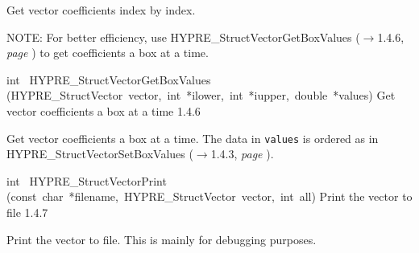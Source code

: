 \documentclass{article}
\begin{document}
\begin{cxxentry}
\begin{cxxentry}
\begin{cxxfunction}
\begin{cxxdoc}
Get vector coefficients index by index.

NOTE: For better efficiency, use HYPRE\_StructVectorGetBoxValues ($\rightarrow$1.4.6, {\em page \pageref{cxx.1.4.6}}) to get
coefficients a box at a time.
\end{cxxdoc}
\end{cxxfunction}
\begin{cxxfunction}
{int\ }
        {HYPRE\_StructVectorGetBoxValues}
        {(HYPRE\_StructVector\ vector,\ int\ *ilower,\ int\ *iupper,\ double\ *values)}
        {
Get vector coefficients a box at a time}
        {1.4.6}
\begin{cxxdoc}

Get vector coefficients a box at a time.  The data in {\tt values} is ordered
as in HYPRE\_StructVectorSetBoxValues ($\rightarrow$1.4.3, {\em page \pageref{cxx.1.4.3}}).
\end{cxxdoc}
\end{cxxfunction}
\begin{cxxfunction}
{int\ }
        {HYPRE\_StructVectorPrint}
        {(const\ char\ *filename,\ HYPRE\_StructVector\ vector,\ int\ all)}
        {
Print the vector to file}
        {1.4.7}
\begin{cxxdoc}

Print the vector to file.  This is mainly for debugging purposes.
\end{cxxdoc}
\end{cxxfunction}
\end{cxxentry}
\end{cxxentry}
\end{document}
